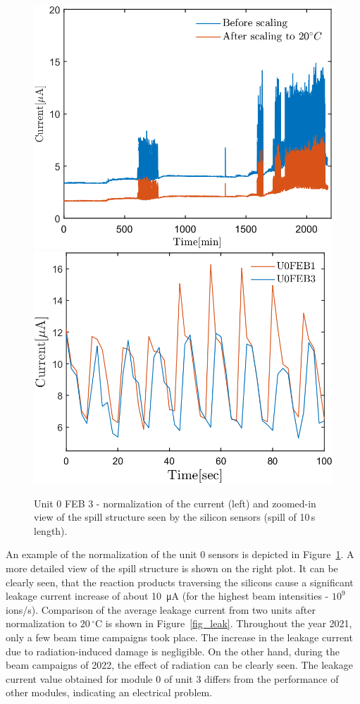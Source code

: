 \begin{figure}[!h]
\centering
\includegraphics[width=0.45\columnwidth]{Chapter6/DCS/images/uranium/current_U_highintensity.png}
\includegraphics[width=0.47\columnwidth]{Chapter6/DCS/images/uranium/U3L1_spill.png}
\caption{Unit 0 \gls{FEB} 3 - normalization of the current (left) and zoomed-in view of the spill structure seen by the silicon sensors (spill of 10\,s length).}
\label{fig_sensors_spill}
\end{figure}

An example of the normalization of the unit 0 sensors is depicted in Figure~\ref{fig_sensors_spill}. A more detailed view of the spill structure is shown on the right plot. It can be clearly seen, that the reaction products traversing the silicons cause a significant leakage current increase of about \SI{10}{\micro A} (for the highest beam intensities - $10^{9}$ ions/s). Comparison of the average leakage current from two units after normalization to $20\,^{\circ}$C is shown in Figure~\ref{fig_leak}. Throughout the year 2021, only a few beam time campaigns took place. The increase in the leakage current due to radiation-induced damage is negligible. On the other hand, during the beam campaigns of 2022, the effect of radiation can be clearly seen. The leakage current value obtained for module 0 of unit 3 differs from the performance of other modules, indicating an electrical problem.

